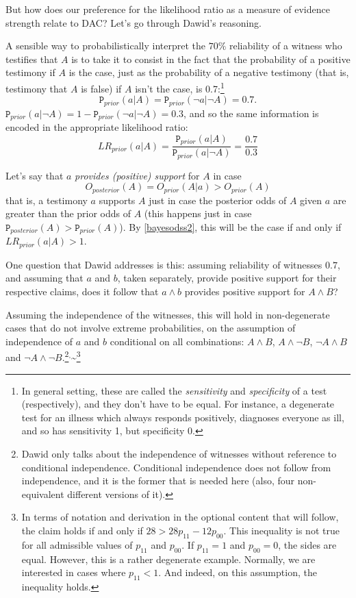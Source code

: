 \documentclass[10pt,dvipsnames,enabledeprecatedfontcommands]{scrartcl}
\newcommand{\n}{\neg}
\newcommand{\et}{\wedge}
\newcommand{\prr}[1]{\mbox{$\mathtt{P}_{prior}(#1)$}}
\newcommand{\prp}[1]{\mbox{$\mathtt{P}_{posterior}(#1)$}}
\begin{document}
But how does our preference for the likelihood ratio as a measure of
evidence strength relate to DAC? Let's go through Dawid's reasoning.

A sensible way to probabilistically interpret the \(70\%\) reliability
of a witness who testifies that \(A\) is to take it to consist in the
fact that the probability of a positive testimony if \(A\) is the case,
just as the probability of a negative testimony (that is, testimony that
\(A\) is false) if \(A\) isn't the case, is
0.7:\footnote{In general setting, these are called the \emph{sensitivity} and \emph{specificity} of a test (respectively), and they don't have to be equal. For instance, a degenerate test for an illness which always responds positively, diagnoses everyone as ill, and so has sensitivity 1, but specificity 0.}
\[\prr{a\vert A}=\prr{\n a\vert\n  A}=0.7.\]
\noindent   \(\prr{a\vert \n A}=1- \prr{\n a\vert \n A}=0.3\), and so
the same information is encoded in the appropriate likelihood ratio:
\[LR_{prior}(a\vert A )=\frac{\prr{a\vert A}}{\prr{a\vert \n A}}= \frac{0.7}{0.3}\]

Let's say that \(a\) \emph{provides (positive) support} for \(A\) in
case \[O_{posterior}(A)=O_{prior}(A\vert a)> O_{prior}(A)\]
\noindent  that is, a testimony \(a\) supports \(A\) just in case the
posterior odds of \(A\) given \(a\) are greater than the prior odds of
\(A\) (this happens just in case \(\prp{A}>\prr{A}\)). By
\eqref{bayesodss2}, this will be the case if and only if
\(LR_{prior}(a\vert A)>1\).

One question that Dawid addresses is this: assuming reliability of
witnesses \(0.7\), and assuming that \(a\) and \(b\), taken separately,
provide positive support for their respective claims, does it follow
that \(a \et b\) provides positive support for \(A\et B\)?

Assuming the independence of the witnesses, this will hold in
non-degenerate cases that do not involve extreme probabilities, on the
assumption of independence of \(a\) and \(b\) conditional on all
combinations: \(A\et B\), \(A\et \n B\), \(\n A \et B\) and
\(\n A \et \n B\).\footnote{Dawid only talks about the independence of witnesses without reference to  conditional independence. Conditional independence does not follow from independence, and it is the former that is needed here (also, four non-equivalent different versions of it).}\(^,\)\textasciitilde{}\footnote{In terms of notation and derivation in the optional content that will follow, the claim holds  if and only if $28 > 28 p_{11}-12p_{00}$.  This inequality is not  true for all admissible values of $p_{11}$ and $p_{00}$. If $p_{11}=1$ and $p_{00}=0$, the sides are equal. However, this is a rather degenerate example. Normally, we are  interested in cases where $p_{11}< 1$. And indeed, on this assumption, the inequality holds.}
\end{document}
